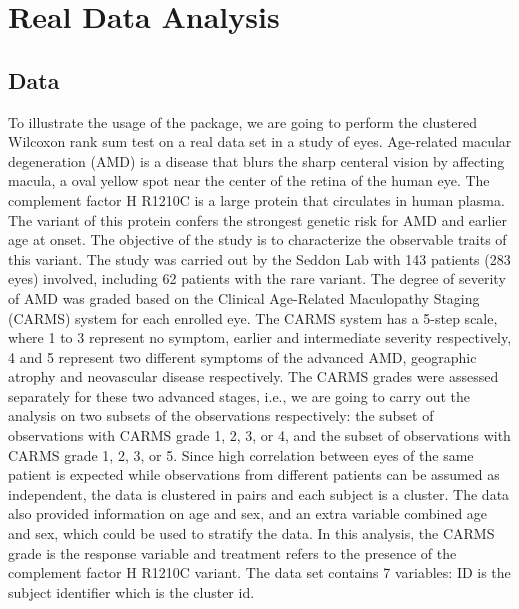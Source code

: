 \documentclass[nojss]{jss}\usepackage[]{graphicx}\usepackage[]{color}
\begin{document}
\section{Real Data Analysis}
\label{real}

\subsection{Data}
To illustrate the usage of the package, we are going to
perform the clustered Wilcoxon rank sum test on a
real data set in a study of eyes.
Age-related macular degeneration (AMD) is a disease
that blurs the sharp centeral vision by
affecting macula, a oval yellow spot
near the center of the retina of the human eye.
The complement factor H R1210C is a large protein
that circulates in human plasma. The variant of
this protein confers the strongest genetic risk
for AMD and earlier age at onset. The objective
of the study is to characterize the observable
traits of this variant. The study was carried out by
the Seddon Lab \citep{Sedd:Shar:Adel:eval:2006,
Ferr:Sedd:phen:2015} with 143 patients (283 eyes)
involved, including 62 patients with the rare
variant. The degree of severity of AMD was graded
based on the Clinical
Age-Related Maculopathy Staging (CARMS) system for
each enrolled eye.
The CARMS system has a
5-step scale, where 1 to 3 represent no symptom,
earlier and intermediate severity respectively,
4 and 5 represent
two different symptoms of the advanced AMD,
geographic atrophy and neovascular disease respectively.
The
CARMS grades were assessed separately for these
two advanced stages, i.e., we are going
to carry out the analysis on two subsets of the
observations respectively: the subset of
observations with
CARMS grade 1, 2, 3, or 4, and the subset of
observations with CARMS grade 1, 2, 3, or 5.
Since high correlation between
eyes of the same patient is expected while
observations from different patients can be assumed
as independent, the data is clustered in pairs and
each subject is a cluster. The data also provided
information on age and sex, and an extra variable
combined age and sex, which could be used to stratify
the data.
In this analysis, the CARMS grade is the response
variable and treatment refers to the presence
of the complement factor H R1210C variant.
The data set contains 7 variables: ID is the
subject identifier which is the cluster id.
\end{document}
